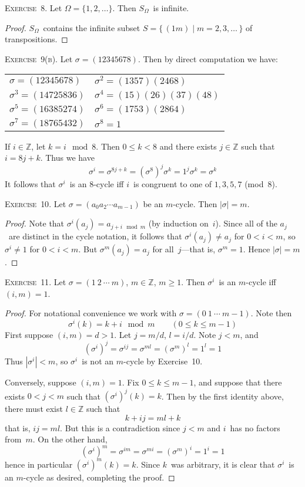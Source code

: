 \documentclass[letterpaper]{article}
\newcommand{\exercise}[1]{\goodbreak\noindent\textsc{Exercise~{#1}.}}
\newcommand{\Z}{\mathbb{Z}}
\newcommand{\ord}[1]{|{#1}|}
\begin{document}
\bigskip
\exercise{8}
Let $\Omega=\{1,2,\ldots\}$. Then $S_{\Omega}$~is infinite.
\begin{proof}
$S_{\Omega}$~contains the infinite subset $S=\{\,(1m)\mid m=2,3,\ldots\,\}$ of transpositions.
\end{proof}

\exercise{9(b)}
Let $\sigma=(12345678)$. Then by direct computation we have:
\begin{center}
\begin{tabular}{ll}
$\sigma=(12345678)$&$\sigma^2=(1357)(2468)$\\
$\sigma^3=(14725836)$&$\sigma^4=(15)(26)(37)(48)$\\
$\sigma^5=(16385274)$&$\sigma^6=(1753)(2864)$\\
$\sigma^7=(18765432)$&$\sigma^8=1$
\end{tabular}
\end{center}
If $i\in\Z$, let $k=i\mod 8$. Then $0\le k<8$ and there exists $j\in\Z$ such that $i=8j+k$. Thus we have
$$\sigma^i=\sigma^{8j+k}=(\sigma^8)^j\sigma^k=1^j\sigma^k=\sigma^k$$
It follows that $\sigma^i$~is an $8$-cycle iff $i$~is congruent to one of $1,3,5,7$ (mod~$8$).

\bigskip
\exercise{10}
Let $\sigma=(a_0a_2\cdots a_{m-1})$ be an $m$-cycle. Then $\ord{\sigma}=m$.
\begin{proof}
Note that $\sigma^i(a_j)=a_{j+i\mod m}$ (by induction on~$i$). Since all of the $a_j$~are distinct in the cycle notation, it follows that $\sigma^i(a_j)\ne a_j$ for $0<i<m$, so $\sigma^i\ne 1$ for $0<i<m$. But $\sigma^m(a_j)=a_j$ for all~$j$---that is, $\sigma^m=1$. Hence $\ord{\sigma}=m$.
\end{proof}

\exercise{11}
Let $\sigma=(1\ 2\ \cdots\ m)$, $m\in\Z$, $m\ge 1$. Then $\sigma^i$~is an $m$-cycle iff $(i,m)=1$.
\begin{proof}
For notational convenience we work with $\sigma=(0\ 1\ \cdots\ m-1)$. Note then
$$\sigma^i(k)=k+i\mod m\qquad (0\le k\le m-1)$$
First suppose $(i,m)=d>1$. Let $j=m/d$, $l=i/d$. Note $j<m$, and
$$(\sigma^i)^j=\sigma^{ij}=\sigma^{ml}=(\sigma^m)^l=1^l=1$$
Thus $\ord{\sigma^i}<m$, so $\sigma^i$~is not an $m$-cycle by Exercise~10.

Conversely, suppose $(i,m)=1$. Fix $0\le k\le m-1$, and suppose that there exists $0<j<m$ such that $(\sigma^i)^j(k)=k$. Then by the first identity above, there must exist $l\in\Z$ such that
$$k+ij=ml+k$$
that is, $ij=ml$. But this is a contradiction since $j<m$ and $i$~has no factors from~$m$. On the other hand,
$$(\sigma^i)^m=\sigma^{im}=\sigma^{mi}=(\sigma^m)^i=1^i=1$$
hence in particular $(\sigma^i)^m(k)=k$. Since $k$~was arbitrary, it is clear that $\sigma^i$~is an $m$-cycle as desired, completing the proof.
\end{proof}
\end{document}
